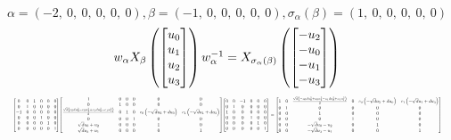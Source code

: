 \documentclass[11pt]{article}
\theoremstyle{definition}
\begin{document}
\[
\alpha = \left( -2, \  0, \  0, \  0, \  0, \  0\right), \beta = \left( -1, \  0, \  0, \  0, \  0, \  0\right), \sigma_{\alpha}(\beta) = \left( 1, \  0, \  0, \  0, \  0, \  0\right)
\]
\[
\scaletoalign{\textwidth}{w_{\alpha} X_{\beta}\left(\left[\begin{matrix}u_{0}\\u_{1}\\u_{2}\\u_{3}\end{matrix}\right]\right) w_{\alpha}^{-1} = X_{\sigma_{\alpha}\left(\beta\right)}\left(\left[\begin{matrix}- u_{2}\\- u_{0}\\- u_{1}\\- u_{3}\end{matrix}\right]\right)}
\]
\[
\scaletoalign{\textwidth}{{\left[\begin{matrix}0 & 0 & 1 & 0 & 0 & 0\\0 & 1 & 0 & 0 & 0 & 0\\-1 & 0 & 0 & 0 & 0 & 0\\0 & 0 & 0 & 1 & 0 & 0\\0 & 0 & 0 & 0 & 1 & 0\\0 & 0 & 0 & 0 & 0 & 1\end{matrix}\right]} {\left[\begin{matrix}1 & 0 & 0 & 0 & 0 & 0\\0 & 1 & 0 & 0 & 0 & 0\\\frac{\sqrt{d} \left(c_{0} d u_{0}^{2} - c_{0} u_{2}^{2} + c_{1} d u_{3}^{2} - c_{1} u_{1}^{2}\right)}{2} & 0 & 1 & 0 & c_{0} \left(- \sqrt{d} u_{2} + d u_{0}\right) & c_{1} \left(- \sqrt{d} u_{1} + d u_{3}\right)\\0 & 0 & 0 & 1 & 0 & 0\\\sqrt{d} u_{0} + u_{2} & 0 & 0 & 0 & 1 & 0\\\sqrt{d} u_{3} + u_{1} & 0 & 0 & 0 & 0 & 1\end{matrix}\right]} {\left[\begin{matrix}0 & 0 & -1 & 0 & 0 & 0\\0 & 1 & 0 & 0 & 0 & 0\\1 & 0 & 0 & 0 & 0 & 0\\0 & 0 & 0 & 1 & 0 & 0\\0 & 0 & 0 & 0 & 1 & 0\\0 & 0 & 0 & 0 & 0 & 1\end{matrix}\right]} = {\left[\begin{matrix}1 & 0 & \frac{\sqrt{d} \left(- c_{0} d u_{0}^{2} + c_{0} u_{2}^{2} - c_{1} d u_{3}^{2} + c_{1} u_{1}^{2}\right)}{2} & 0 & c_{0} \left(- \sqrt{d} u_{2} + d u_{0}\right) & c_{1} \left(- \sqrt{d} u_{1} + d u_{3}\right)\\0 & 1 & 0 & 0 & 0 & 0\\0 & 0 & 1 & 0 & 0 & 0\\0 & 0 & 0 & 1 & 0 & 0\\0 & 0 & - \sqrt{d} u_{0} - u_{2} & 0 & 1 & 0\\0 & 0 & - \sqrt{d} u_{3} - u_{1} & 0 & 0 & 1\end{matrix}\right]}}
\]
\end{document}
